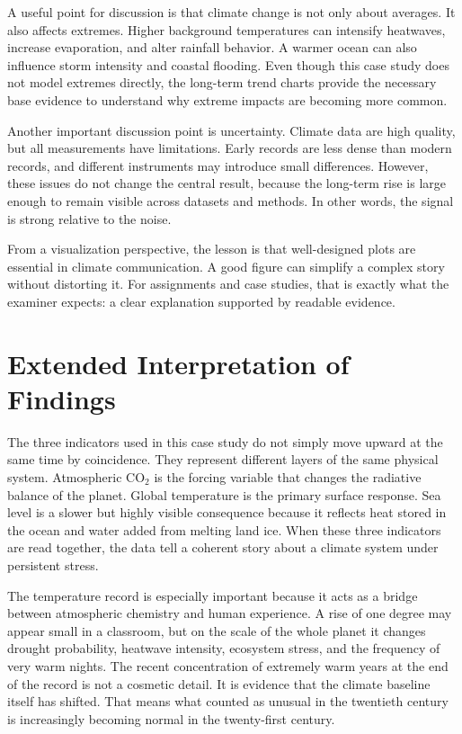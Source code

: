 \documentclass[conference]{IEEEtran}
\begin{document}
A useful point for discussion is that climate change is not only about averages. It also affects extremes. Higher background temperatures can intensify heatwaves, increase evaporation, and alter rainfall behavior. A warmer ocean can also influence storm intensity and coastal flooding. Even though this case study does not model extremes directly, the long-term trend charts provide the necessary base evidence to understand why extreme impacts are becoming more common.

Another important discussion point is uncertainty. Climate data are high quality, but all measurements have limitations. Early records are less dense than modern records, and different instruments may introduce small differences. However, these issues do not change the central result, because the long-term rise is large enough to remain visible across datasets and methods. In other words, the signal is strong relative to the noise.

From a visualization perspective, the lesson is that well-designed plots are essential in climate communication. A good figure can simplify a complex story without distorting it. For assignments and case studies, that is exactly what the examiner expects: a clear explanation supported by readable evidence.


\section{Extended Interpretation of Findings}
The three indicators used in this case study do not simply move upward at the same time by coincidence. They represent different layers of the same physical system. Atmospheric CO$_2$ is the forcing variable that changes the radiative balance of the planet. Global temperature is the primary surface response. Sea level is a slower but highly visible consequence because it reflects heat stored in the ocean and water added from melting land ice. When these three indicators are read together, the data tell a coherent story about a climate system under persistent stress.

The temperature record is especially important because it acts as a bridge between atmospheric chemistry and human experience. A rise of one degree may appear small in a classroom, but on the scale of the whole planet it changes drought probability, heatwave intensity, ecosystem stress, and the frequency of very warm nights. The recent concentration of extremely warm years at the end of the record is not a cosmetic detail. It is evidence that the climate baseline itself has shifted. That means what counted as unusual in the twentieth century is increasingly becoming normal in the twenty-first century.
\end{document}
